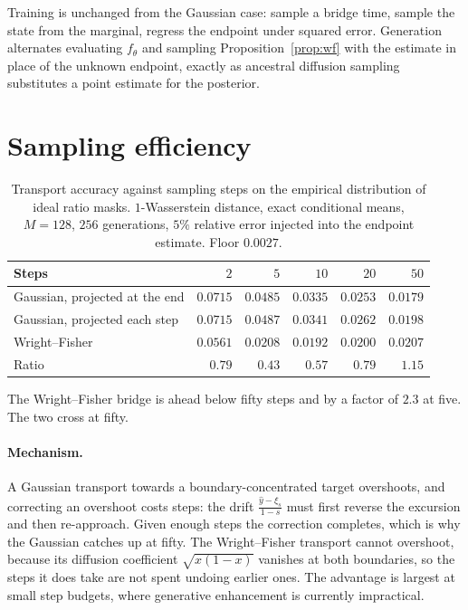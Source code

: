 \documentclass[11pt,a4paper]{article}
\def\xib{\xi}
\begin{document}
Training is unchanged from the Gaussian case: sample a bridge time, sample the
state from the marginal, regress the endpoint under squared error. Generation
alternates evaluating $f_\theta$ and sampling Proposition~\ref{prop:wf} with the
estimate in place of the unknown endpoint, exactly as ancestral diffusion
sampling substitutes a point estimate for the posterior.

\section{Sampling efficiency}
\label{sec:why}

\begin{table}[h]
\centering\small
\caption{Transport accuracy against sampling steps on the empirical distribution
of ideal ratio masks. $1$-Wasserstein distance, exact conditional means,
$M=128$, $256$ generations, $5\%$ relative error injected into the endpoint
estimate. Floor $0.0027$.}
\label{tab:wf}
\begin{tabular}{lrrrrr}
\toprule
Steps & $2$ & $5$ & $10$ & $20$ & $50$ \\
\midrule
Gaussian, projected at the end & $0.0715$ & $0.0485$ & $0.0335$ & $0.0253$ & $\mathbf{0.0179}$ \\
Gaussian, projected each step  & $0.0715$ & $0.0487$ & $0.0341$ & $0.0262$ & $0.0198$ \\
Wright--Fisher                 & $\mathbf{0.0561}$ & $\mathbf{0.0208}$ & $\mathbf{0.0192}$ & $\mathbf{0.0200}$ & $0.0207$ \\
\midrule
Ratio & $0.79$ & $0.43$ & $0.57$ & $0.79$ & $1.15$ \\
\bottomrule
\end{tabular}
\end{table}

The Wright--Fisher bridge is ahead below fifty steps and by a factor of $2.3$ at
five. The two cross at fifty.

\paragraph{Mechanism.} A Gaussian transport towards a boundary-concentrated
target overshoots, and correcting an overshoot costs steps: the drift
$\frac{\hat y-\xib_s}{1-s}$ must first reverse the excursion and then re-approach.
Given enough steps the correction completes, which is why the Gaussian catches
up at fifty. The Wright--Fisher transport cannot overshoot, because its
diffusion coefficient $\sqrt{x(1-x)}$ vanishes at both boundaries, so the steps
it does take are not spent undoing earlier ones. The advantage is largest at small step budgets, where generative enhancement is
currently impractical.
\end{document}
